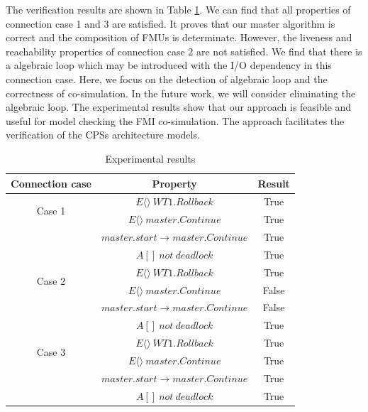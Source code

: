 The verification results are shown in Table \ref{rs}. We can find that all properties of connection case 1 and 3 are satisfied. It proves that our master algorithm is correct and the composition of FMUs is determinate. However, the liveness and reachability properties of connection case 2 are not satisfied. We find that there is a algebraic loop which may be introduced with the I/O dependency in this connection case. Here, we focus on the detection of algebraic loop and the correctness of co-simulation. In the future work, we will consider eliminating the algebraic loop. The experimental results show that our approach is feasible and useful for model checking the FMI co-simulation. The approach facilitates the verification of the CPSs architecture models.
\begin{table}
\caption{Experimental results}
\centering
\begin{tabular}{c c c} 
        \hline  
        Connection case & Property & Result\\
        \hline
        \multirow{2}{2.0cm}{Case 1}  
                & $E\langle\rangle~WT1.Rollback$ & True\\ 
                & $E\langle\rangle~master.Continue$ & True\\ 
                & $master.start\rightarrow master.Continue$ & True\\ 
                & $A[]~not~deadlock$ & True\\   
        \hline 
        \multirow{2}{2.0cm}{Case 2}  
                & $E\langle\rangle~WT1.Rollback$ & True\\ 
                & $E\langle\rangle~master.Continue$ & False\\ 
                & $master.start\rightarrow master.Continue$ & False\\ 
                & $A[]~not~deadlock$ & True\\   
        \hline 
        \multirow{2}{2.0cm}{Case 3}  
                & $E\langle\rangle~WT1.Rollback$ & True\\ 
                & $E\langle\rangle~master.Continue$ & True\\ 
                & $master.start \rightarrow master.Continue$ & True\\ 
                & $A[]~not~deadlock$ & True\\   
        \hline 
\end{tabular} 
\label{rs}
\end{table}




